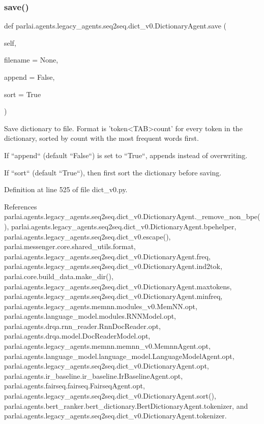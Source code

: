 \subsubsection{\texorpdfstring{save()}{save()}}
{\footnotesize\ttfamily def parlai.\+agents.\+legacy\+\_\+agents.\+seq2seq.\+dict\+\_\+v0.\+Dictionary\+Agent.\+save (\begin{DoxyParamCaption}\item[{}]{self,  }\item[{}]{filename = {\ttfamily None},  }\item[{}]{append = {\ttfamily False},  }\item[{}]{sort = {\ttfamily True} }\end{DoxyParamCaption})}

\begin{DoxyVerb}Save dictionary to file.
Format is 'token<TAB>count' for every token in the dictionary, sorted
by count with the most frequent words first.

If ``append`` (default ``False``) is set to ``True``, appends instead of
overwriting.

If ``sort`` (default ``True``), then first sort the dictionary before saving.
\end{DoxyVerb}
 

Definition at line 525 of file dict\+\_\+v0.\+py.



References parlai.\+agents.\+legacy\+\_\+agents.\+seq2seq.\+dict\+\_\+v0.\+Dictionary\+Agent.\+\_\+remove\+\_\+non\+\_\+bpe(), parlai.\+agents.\+legacy\+\_\+agents.\+seq2seq.\+dict\+\_\+v0.\+Dictionary\+Agent.\+bpehelper, parlai.\+agents.\+legacy\+\_\+agents.\+seq2seq.\+dict\+\_\+v0.\+escape(), parlai.\+messenger.\+core.\+shared\+\_\+utils.\+format, parlai.\+agents.\+legacy\+\_\+agents.\+seq2seq.\+dict\+\_\+v0.\+Dictionary\+Agent.\+freq, parlai.\+agents.\+legacy\+\_\+agents.\+seq2seq.\+dict\+\_\+v0.\+Dictionary\+Agent.\+ind2tok, parlai.\+core.\+build\+\_\+data.\+make\+\_\+dir(), parlai.\+agents.\+legacy\+\_\+agents.\+seq2seq.\+dict\+\_\+v0.\+Dictionary\+Agent.\+maxtokens, parlai.\+agents.\+legacy\+\_\+agents.\+seq2seq.\+dict\+\_\+v0.\+Dictionary\+Agent.\+minfreq, parlai.\+agents.\+legacy\+\_\+agents.\+memnn.\+modules\+\_\+v0.\+Mem\+N\+N.\+opt, parlai.\+agents.\+language\+\_\+model.\+modules.\+R\+N\+N\+Model.\+opt, parlai.\+agents.\+drqa.\+rnn\+\_\+reader.\+Rnn\+Doc\+Reader.\+opt, parlai.\+agents.\+drqa.\+model.\+Doc\+Reader\+Model.\+opt, parlai.\+agents.\+legacy\+\_\+agents.\+memnn.\+memnn\+\_\+v0.\+Memnn\+Agent.\+opt, parlai.\+agents.\+language\+\_\+model.\+language\+\_\+model.\+Language\+Model\+Agent.\+opt, parlai.\+agents.\+legacy\+\_\+agents.\+seq2seq.\+dict\+\_\+v0.\+Dictionary\+Agent.\+opt, parlai.\+agents.\+ir\+\_\+baseline.\+ir\+\_\+baseline.\+Ir\+Baseline\+Agent.\+opt, parlai.\+agents.\+fairseq.\+fairseq.\+Fairseq\+Agent.\+opt, parlai.\+agents.\+legacy\+\_\+agents.\+seq2seq.\+dict\+\_\+v0.\+Dictionary\+Agent.\+sort(), parlai.\+agents.\+bert\+\_\+ranker.\+bert\+\_\+dictionary.\+Bert\+Dictionary\+Agent.\+tokenizer, and parlai.\+agents.\+legacy\+\_\+agents.\+seq2seq.\+dict\+\_\+v0.\+Dictionary\+Agent.\+tokenizer.



